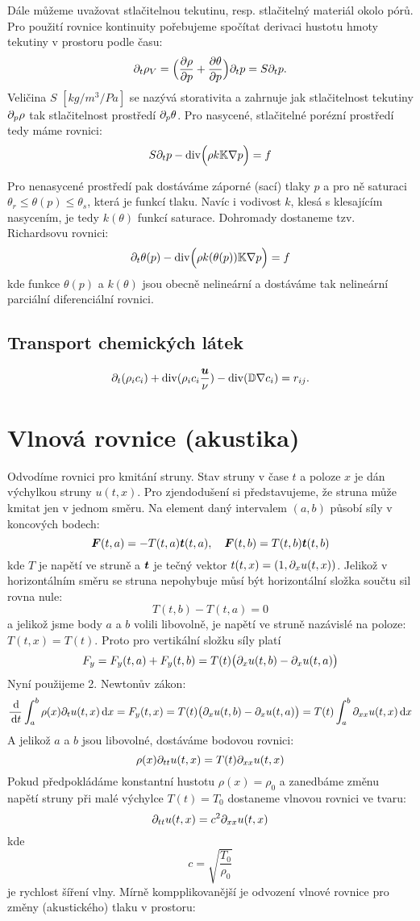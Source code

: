 Dále můžeme uvažovat stlačitelnou tekutinu, resp. stlačitelný materiál okolo pórů. Pro použití rovnice kontinuity pořebujeme spočítat derivaci 
hustotu hmoty tekutiny v prostoru podle času:
\[
    \partial_t \rho_V = \Big(\frac{\partial \rho}{\partial p} + \frac{\partial \theta}{\partial p}\Big)\partial_t p = S\partial_t p.
\]
Veličina $S$ $[kg/m^3/Pa]$ se nazývá storativita a zahrnuje jak stlačitelnost tekutiny $\partial_p \rho$ tak stlačitelnost prostředí $\partial_p \theta$.
Pro nasycené, stlačitelné porézní prostředí tedy máme rovnici:
\[
    S \partial_t p -{\rm div}\Big( \rho k{\mathbb{K}} \nabla p\Big) = f
\]

Pro nenasycené prostředí pak dostáváme záporné (sací) tlaky $p$ a pro ně saturaci $\theta_r \le \theta(p) \le \theta_s$, která je funkcí tlaku. 
Navíc i vodivost $k$, klesá s klesajícím nasycením, je tedy $k(\theta)$ funkcí saturace. Dohromady dostaneme tzv. Richardsovu rovnici:
\[
    \partial_t \theta(p) -{\rm div}\Big( \rho k(\theta(p)) {\mathbb{K}} \nabla p\Big) = f
\]
kde funkce $\theta(p)$ a $k(\theta)$ jsou obecně nelineární a dostáváme tak nelineární parciální diferenciální rovnici.



\subsection{Transport chemických látek}
\begin{equation}
    \partial_t (\rho_i c_i) + {\rm div} (\rho_i c_i \frac{\mathbf{\boldsymbol{u}}}{\nu}) - {\rm div}( {\mathbb{D}} \nabla c_i) = r_{ij}.
\end{equation}


\section{Vlnová rovnice (akustika)}

Odvodíme rovnici pro kmitání struny. Stav struny v čase $t$ a poloze $x$ je dán výchylkou struny $u(t,x)$. Pro zjendodušení si představujeme, 
že struna může kmitat jen v jednom směru. Na element daný intervalem $(a,b)$ působí síly v koncových bodech:
\[
    \mathbf{\boldsymbol{F}}(t,a) = -T(t,a) \mathbf{\boldsymbol{t}}(t,a),\quad \mathbf{\boldsymbol{F}}(t,b) = T(t,b) \mathbf{\boldsymbol{t}}(t, b)
\]
kde $T$ je napětí ve struně a $\mathbf{\boldsymbol{t}}$ je tečný vektor $ t(t, x) = ( 1, \partial_x u(t,x) )$. 
Jelikož v horizontálním směru se struna nepohybuje můsí být horizontální složka součtu sil rovna nule:
\[
    T(t,b) - T(t,a) = 0
\]
a jelikož jsme body $a$ a $b$ volili libovolně,  je napětí ve struně nazávislé na poloze: $T(t, x) = T(t)$.
Proto pro vertikální složku síly platí 
\[
    F_y = F_y(t,a) + F_y(t,b) = T(t)\big(\partial_x u(t,b) - \partial_x u(t,a)\big)
\]
Nyní použijeme 2. Newtonův zákon:
\[
    \frac{\,{\rm d}}{\,{\rm d}{t}} \int_a^b \rho(x) \partial_t u(t,x) \,{\rm d} x = F_y(t,x) = T(t)\big(\partial_x u(t,b) - \partial_x u(t,a)\big) = T(t) \int_a^b \partial_{xx} u(t,x) \,{\rm d} x 
\]
A jelikož $a$ a $b$ jsou libovolné, dostáváme bodovou rovnici:
\[
    \rho(x) \partial_{tt} u(t,x) = T(t) \partial_{xx} u(t,x) 
\]
Pokud předpokládáme konstantní hustotu $\rho(x) = \rho_0$ a zanedbáme změnu napětí struny při malé výchylce $T(t)=T_0$ dostaneme vlnovou rovnici ve tvaru:
\[
    \partial_{tt} u(t,x) = c^2 \partial_{xx} u(t,x)
\]
kde 
\[
    c=\sqrt{\frac{T_0}{\rho_0}}
\]
je rychlost šíření vlny. 
Mírně kompplikovanější je odvození vlnové rovnice pro změny (akustického) tlaku v prostoru:

